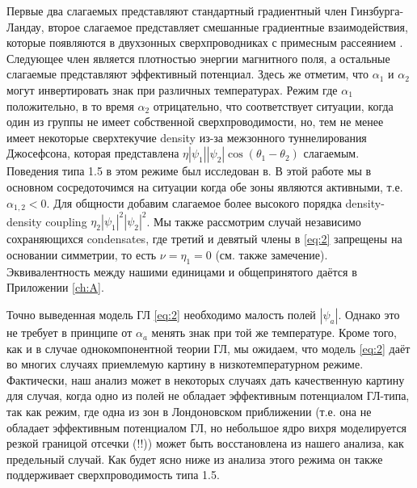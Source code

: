 Первые два слагаемых представляют стандартный градиентный член 
Гинзбурга-Ландау, второе слагаемое представляет смешанные градиентные 
взаимодействия, которые появляются в двухзонных сверхпроводниках с примесным 
рассеянием \cite{bib:8,bib:9}. Следующее член является плотностью энергии 
магнитного поля, а остальные слагаемые представляют эффективный потенциал. 
Здесь же отметим, что \( \alpha_1 \) и \( \alpha_2 \) могут инвертировать знак 
при различных температурах. Режим где \( \alpha_1 \) положительно, в то время 
\( \alpha_2 \) отрицательно, что соответствует ситуации, когда один из группы 
не имеет собственной сверхпроводимости, но, тем не менее имеет некоторые 
сверхтекучие density из-за межзонного туннелирования Джосефсона, которая 
представлена \( \eta|\psi_1||\psi_2|\cos(\theta_1-\theta_2) \) слагаемым. 
Поведения типа 1.5 в этом режиме был исследован в\cite{bib:2}. В этой работе 
мы в основном сосредоточимся на ситуации когда обе зоны являются активными, 
т.е. \( \alpha_{1,2} < 0 \). Для общности добавим слагаемое более высокого 
порядка density-density coupling \( \eta_2|\psi_1|^2|\psi_2|^2 \). Мы также 
рассмотрим случай независимо сохраняющихся condensates, где третий и девятый 
члены в \eqref{eq:2} запрещены на основании симметрии, то есть 
\( \nu = \eta_1 = 0 \) (см. также замечение\cite{bib:21}). Эквивалентность 
между нашими единицами и общепринятого даётся в Приложении \ref{ch:A}.

Точно выведенная модель ГЛ \eqref{eq:2} необходимо малость полей \( |\psi_a| \). 
Однако это не требует в принципе от \( \alpha_a \) менять знак при той же 
температуре. Кроме того, как и в случае однокомпонентной теории ГЛ, мы 
ожидаем, что модель \eqref{eq:2} даёт во многих случаях приемлемую картину в 
низкотемпературном режиме. Фактически, наш анализ может в некоторых случаях 
дать качественную картину для случая, когда одно из полей не обладает 
эффективным потенциалом ГЛ-типа, так как режим, где одна из зон в Лондоновском 
приближении (т.е. она не обладает эффективным потенциалом ГЛ, но небольшое ядро 
вихря моделируется резкой границой отсечки (!!)) может быть восстановлена из нашего 
анализа, как предельный случай. Как будет ясно ниже из анализа этого режима он 
также поддерживает сверхпроводимость типа 1.5.

